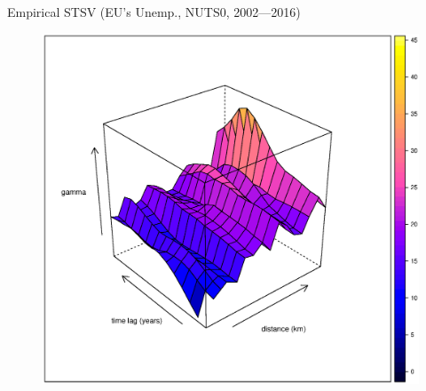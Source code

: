 \documentclass{beamer}
\begin{document}
\begin{frame}{Empirical STSV (EU's Unemp., NUTS0, 2002---2016)}
\begin{figure}
	\includegraphics[width=.7\textwidth]{IMG/sp_STV.eps}
\end{figure}
\end{frame}
\end{document}
